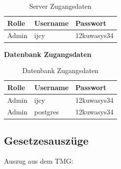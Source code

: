 \documentclass[12pt, twoside, a4paper, ngerman]{article}
\begin{document}
\begin{appendix}
\begin{table}[H]
\begin{center}
	\begin{tabular}{|l|l|l||}\hline
		\textbf{Rolle} & \textbf{Username} & \textbf{Passwort} \\ \hline
		Admin & ijcy & 12kuwasys34 \\ \hline \hline
	\end{tabular}
	\caption{Server Zugangsdaten}
\end{center}
\end{table}

\textbf{Datenbank Zugangsdaten}

\begin{table}[H]
\begin{center}
	\begin{tabular}{|l|l|l||}\hline
		\textbf{Rolle} & \textbf{Username} & \textbf{Passwort} \\ \hline
		Admin & ijcy & 12kuwasys34 \\ \hline
		Admin & postgres & 12kuwasys34 \\ \hline \hline
	\end{tabular}
	\caption{Datenbank Zugangsdaten}
\end{center}
\end{table}

\subsection{Gesetzesauszüge}\label{subsec:Gesetz}

Auszug aus dem \ac{TMG}:


\end{appendix}
\end{document}
